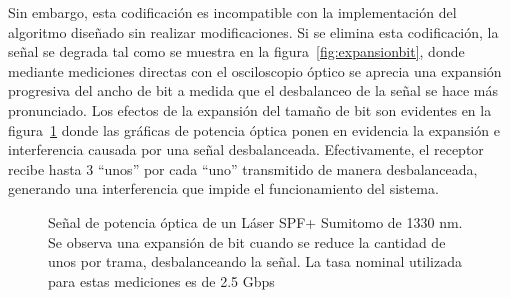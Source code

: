 Sin embargo, esta codificación es incompatible con la implementación del algoritmo diseñado sin realizar modificaciones. Si se elimina esta codificación, la señal se degrada tal como se muestra en la figura~\ref{fig:expansionbit}, donde mediante mediciones directas con el osciloscopio óptico se aprecia una expansión progresiva del ancho de bit a medida que el desbalanceo de la señal se hace más pronunciado. Los efectos de la expansión del tamaño de bit son evidentes en la figura~\ref{fig:ImgExpansion} donde las gráficas de potencia óptica ponen en evidencia la expansión e interferencia causada por una señal desbalanceada.
Efectivamente, el receptor recibe hasta 3 ``unos'' por cada ``uno'' transmitido de manera desbalanceada, generando una interferencia que impide el funcionamiento del sistema.


\begin{figure}[!t]
   \centering
   \qquad
   \qquad
  \caption {Señal de potencia óptica de un Láser SPF+ Sumitomo de 1330 nm. Se observa una expansión de bit cuando se reduce la cantidad de unos por trama, desbalanceando la señal. La tasa nominal utilizada para estas mediciones es de 2.5 Gbps}
  \label{fig:ImgExpansion}
\end{figure}

